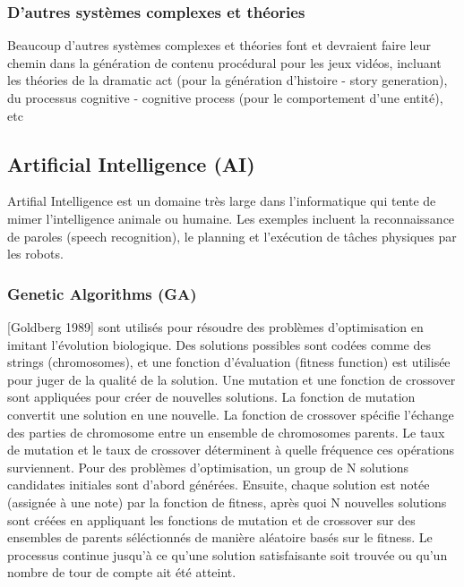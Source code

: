 \documentclass[11pt]{report}
\begin{document}
\subsubsection{D'autres systèmes complexes et théories} Beaucoup d'autres systèmes complexes et théories font et devraient faire leur chemin dans la génération de contenu procédural pour les jeux vidéos, incluant les théories de la dramatic act (pour la génération d'histoire - story generation), du processus cognitive - cognitive process (pour le comportement d'une entité), etc

\subsection{Artificial Intelligence (AI)}
Artifial Intelligence est un domaine très large dans l'informatique qui tente de mimer l'intelligence animale ou humaine. Les exemples incluent la reconnaissance de paroles (speech recognition), le planning et l'exécution de tâches physiques par les robots.

\subsubsection{Genetic Algorithms (GA)} [Goldberg 1989] sont utilisés pour résoudre des problèmes d'optimisation en imitant l'évolution biologique. Des solutions possibles sont codées comme des strings (chromosomes), et une fonction d'évaluation (fitness function) est utilisée pour juger de la qualité de la solution. Une mutation et une fonction de crossover sont appliquées pour créer de nouvelles solutions. La fonction de mutation convertit une solution en une nouvelle. La fonction de crossover spécifie l'échange des parties de chromosome entre un ensemble de chromosomes parents. Le taux de mutation et le taux de crossover déterminent à quelle fréquence ces  opérations surviennent.
Pour des problèmes d'optimisation, un group de N solutions candidates initiales sont d'abord générées. Ensuite, chaque solution est notée (assignée à une note) par la fonction de fitness, après quoi N nouvelles solutions sont créées en appliquant les fonctions de mutation et de crossover sur des ensembles de parents séléctionnés de manière aléatoire basés sur le fitness. Le processus continue jusqu'à ce qu'une solution satisfaisante soit trouvée ou qu'un nombre de tour de compte ait été atteint.
\end{document}
